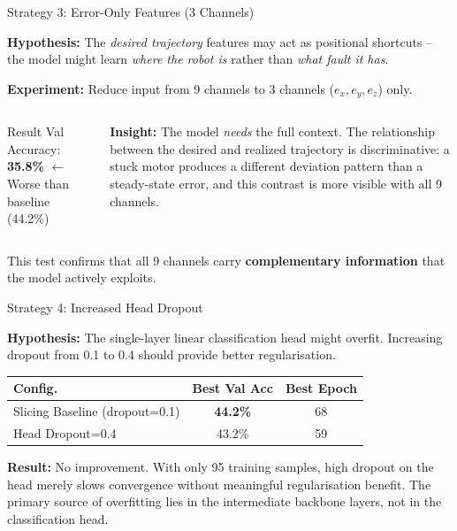 \documentclass{beamer}
\begin{document}
\begin{frame}{Strategy 3: Error-Only Features (3 Channels)}

    \textbf{Hypothesis:} The \textit{desired trajectory} features may act as positional shortcuts -- the model might learn \textit{where the robot is} rather than \textit{what fault it has}.

    \vspace{0.2cm}
    \textbf{Experiment:} Reduce input from 9 channels to 3 channels ($e_x, e_y, e_z$) only.

    \vspace{0.2cm}
    \begin{columns}
        \begin{alertblock}{Result}
            Val Accuracy: \textbf{35.8\%} $\leftarrow$ Worse than baseline (44.2\%)
        \end{alertblock}

        \textbf{Insight:} The model \textit{needs} the full context. The relationship between the desired and realized trajectory is discriminative: a stuck motor produces a different deviation pattern than a steady-state error, and this contrast is more visible with all 9 channels.
    \end{columns}

    \vspace{0.2cm}
    This test confirms that all 9 channels carry \textbf{complementary information} that the model actively exploits.
\end{frame}

\begin{frame}{Strategy 4: Increased Head Dropout}

    \textbf{Hypothesis:} The single-layer linear classification head might overfit. Increasing dropout from 0.1 to 0.4 should provide better regularisation.

    \vspace{0.2cm}
    \begin{table}[]
        \centering
        \begin{tabular}{@{}lcc@{}}
            \toprule
            \textbf{Config.} & \textbf{Best Val Acc} & \textbf{Best Epoch} \\
            \midrule
            Slicing Baseline (dropout=0.1) & \textbf{44.2\%} & 68 \\
            Head Dropout=0.4              & 43.2\%           & 59 \\
            \bottomrule
        \end{tabular}
    \end{table}

    \vspace{0.2cm}
    \textbf{Result:} No improvement. With only 95 training samples, high dropout on the head merely slows convergence without meaningful regularisation benefit. The primary source of overfitting lies in the intermediate backbone layers, not in the classification head.
\end{frame}
\end{document}
